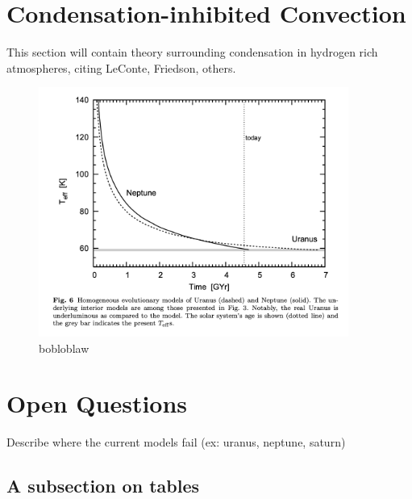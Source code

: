 \documentclass[11pt]{ucscthesisbs}
\begin{document}
\section{Condensation-inhibited Convection}\label{subsection_example}


This section will contain theory surrounding condensation in hydrogen rich atmospheres, citing LeConte, Friedson, others.

\begin{figure}[t!]
 \centerline{
  \includegraphics[width=4.0in]{fortney_nettelmann2010_UN_curves.png}
 }
\caption[Transverse Scans at difference Temperatures at $H=11$~T]
{bobloblaw 
}
\label{fig:discretescan}
\end{figure}

\section{Open Questions}\label{open_questions}
Describe where the current models fail (ex: uranus, neptune, saturn)



\subsection{A subsection on tables}\label{tables}
\end{document}
